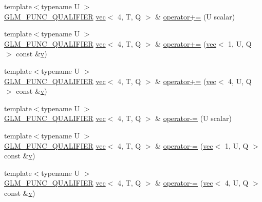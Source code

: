 \begin{DoxyCompactItemize}
{\footnotesize template$<$typename U $>$ }\\\mbox{\hyperlink{setup_8hpp_a33fdea6f91c5f834105f7415e2a64407}{G\+L\+M\+\_\+\+F\+U\+N\+C\+\_\+\+Q\+U\+A\+L\+I\+F\+I\+ER}} \mbox{\hyperlink{structglm_1_1vec}{vec}}$<$ 4, T, Q $>$ \& \mbox{\hyperlink{structglm_1_1vec_3_014_00_01_t_00_01_q_01_4_a96606ae109d8037bfb8ff43c40b25609}{operator+=}} (U scalar)
\item 
{\footnotesize template$<$typename U $>$ }\\\mbox{\hyperlink{setup_8hpp_a33fdea6f91c5f834105f7415e2a64407}{G\+L\+M\+\_\+\+F\+U\+N\+C\+\_\+\+Q\+U\+A\+L\+I\+F\+I\+ER}} \mbox{\hyperlink{structglm_1_1vec}{vec}}$<$ 4, T, Q $>$ \& \mbox{\hyperlink{structglm_1_1vec_3_014_00_01_t_00_01_q_01_4_af625138d4bb7efba666576ceef07eb17}{operator+=}} (\mbox{\hyperlink{structglm_1_1vec}{vec}}$<$ 1, U, Q $>$ const \&\mbox{\hyperlink{_s_d_l__opengl_8h_a10a82eabcb59d2fcd74acee063775f90}{v}})
\item 
{\footnotesize template$<$typename U $>$ }\\\mbox{\hyperlink{setup_8hpp_a33fdea6f91c5f834105f7415e2a64407}{G\+L\+M\+\_\+\+F\+U\+N\+C\+\_\+\+Q\+U\+A\+L\+I\+F\+I\+ER}} \mbox{\hyperlink{structglm_1_1vec}{vec}}$<$ 4, T, Q $>$ \& \mbox{\hyperlink{structglm_1_1vec_3_014_00_01_t_00_01_q_01_4_a39b0ffcd7cb03511bb234d52860f5ce8}{operator+=}} (\mbox{\hyperlink{structglm_1_1vec}{vec}}$<$ 4, U, Q $>$ const \&\mbox{\hyperlink{_s_d_l__opengl_8h_a10a82eabcb59d2fcd74acee063775f90}{v}})
\item 
{\footnotesize template$<$typename U $>$ }\\\mbox{\hyperlink{setup_8hpp_a33fdea6f91c5f834105f7415e2a64407}{G\+L\+M\+\_\+\+F\+U\+N\+C\+\_\+\+Q\+U\+A\+L\+I\+F\+I\+ER}} \mbox{\hyperlink{structglm_1_1vec}{vec}}$<$ 4, T, Q $>$ \& \mbox{\hyperlink{structglm_1_1vec_3_014_00_01_t_00_01_q_01_4_aea3f23ac07ef99b7189102d95bf26a85}{operator-\/=}} (U scalar)
\item 
{\footnotesize template$<$typename U $>$ }\\\mbox{\hyperlink{setup_8hpp_a33fdea6f91c5f834105f7415e2a64407}{G\+L\+M\+\_\+\+F\+U\+N\+C\+\_\+\+Q\+U\+A\+L\+I\+F\+I\+ER}} \mbox{\hyperlink{structglm_1_1vec}{vec}}$<$ 4, T, Q $>$ \& \mbox{\hyperlink{structglm_1_1vec_3_014_00_01_t_00_01_q_01_4_abad73477e54831bdea3d23dfb24ce436}{operator-\/=}} (\mbox{\hyperlink{structglm_1_1vec}{vec}}$<$ 1, U, Q $>$ const \&\mbox{\hyperlink{_s_d_l__opengl_8h_a10a82eabcb59d2fcd74acee063775f90}{v}})
\item 
{\footnotesize template$<$typename U $>$ }\\\mbox{\hyperlink{setup_8hpp_a33fdea6f91c5f834105f7415e2a64407}{G\+L\+M\+\_\+\+F\+U\+N\+C\+\_\+\+Q\+U\+A\+L\+I\+F\+I\+ER}} \mbox{\hyperlink{structglm_1_1vec}{vec}}$<$ 4, T, Q $>$ \& \mbox{\hyperlink{structglm_1_1vec_3_014_00_01_t_00_01_q_01_4_ae943070d1a4e295555306d52eab887c4}{operator-\/=}} (\mbox{\hyperlink{structglm_1_1vec}{vec}}$<$ 4, U, Q $>$ const \&\mbox{\hyperlink{_s_d_l__opengl_8h_a10a82eabcb59d2fcd74acee063775f90}{v}})

\end{DoxyCompactItemize}
